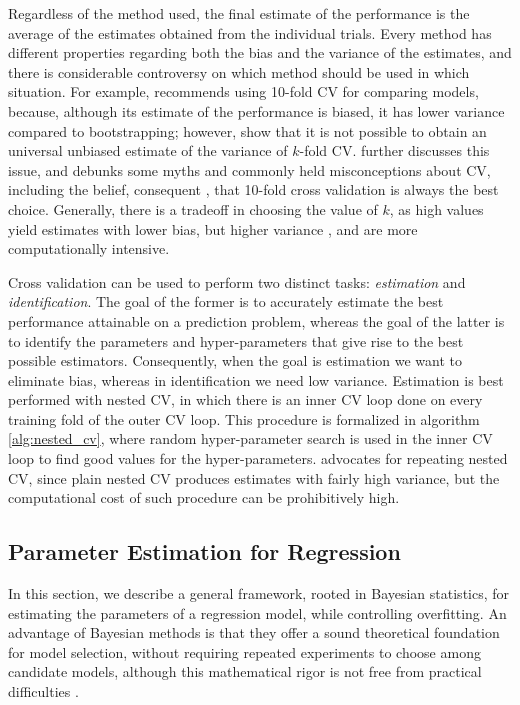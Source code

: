 \documentclass[a4paper]{book}
\begin{document}
Regardless of the method used, the final estimate of the performance is the average of the estimates obtained from the individual trials. Every method has different properties regarding both the bias and the variance of the estimates, and there is considerable controversy on which method should be used in which situation. For example, \cite{cv_bootstrap} recommends using 10-fold CV for comparing models, because, although its estimate of the performance is biased, it has lower variance compared to bootstrapping; however, \cite{no_unbiased_cv} show that it is not possible to obtain an universal unbiased estimate of the variance of $k$-fold CV. \cite{cvmyths} further discusses this issue, and debunks some myths and commonly held misconceptions about CV, including the belief, consequent \cite{cv_bootstrap}, that 10-fold cross validation is always the best choice. Generally, there is a tradeoff in choosing the value of $k$, as high values yield estimates with lower bias, but higher variance \citep{cv_survey}, and are more computationally intensive.

Cross validation can be used to perform two distinct tasks: \emph{estimation} and \emph{identification}. The goal of the former is to accurately estimate the best performance attainable on a prediction problem, whereas the goal of the latter is to identify the parameters and hyper-parameters that give rise to the best possible estimators. Consequently, when the goal is estimation we want to eliminate bias, whereas in identification we need low variance. Estimation is best performed with nested CV\citep{nested_cv_stone,nested_cv_varma}, in which there is an inner CV loop done on every training fold of the outer CV loop. This procedure is formalized in algorithm \ref{alg:nested_cv}, where random hyper-parameter search \citep{random_search} is used in the inner CV loop to find good values for the hyper-parameters. \cite{cv_pitfalls} advocates for repeating nested CV, since plain nested CV produces estimates with fairly high variance, but the computational cost of such procedure can be prohibitively high.


\subsection{Parameter Estimation for Regression}
\label{sec:regression_fit}

In this section, we describe a general framework, rooted in Bayesian statistics, for estimating the parameters of a regression model, while controlling overfitting. An advantage of Bayesian methods is that they offer a sound theoretical foundation for model selection, without requiring repeated experiments to choose among candidate models, although this mathematical rigor is not free from practical difficulties \citep{bayesian_model_selection, practical_bayesian_model_selection}.
\end{document}
